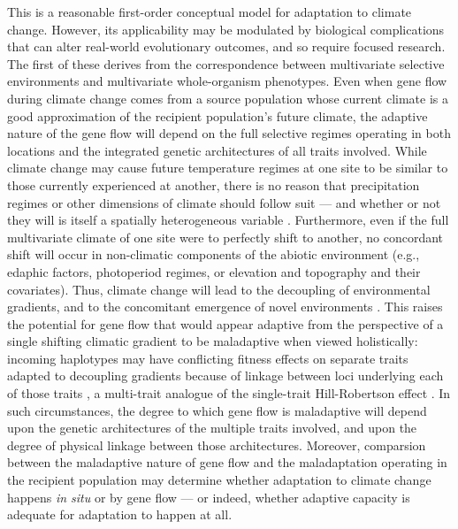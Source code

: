 \documentclass[9pt,twocolumn,twoside,lineno]{pnas-new}
\begin{document}
This is a reasonable first-order conceptual model
for adaptation to climate change.
However, its applicability may be modulated by biological complications
that can alter real-world evolutionary outcomes, and
so require focused research. 
The first of these derives from the correspondence between 
multivariate selective environments and multivariate whole-organism phenotypes. 
Even when gene 
flow during climate change comes from a source population whose current climate is a 
good approximation of the recipient population’s future climate, the adaptive nature 
of the gene flow will depend on the full selective regimes operating in both locations
and the integrated genetic architectures of all traits involved. 
While climate change may cause 
future temperature regimes at one site to be similar to those currently 
experienced at another, there is no reason that precipitation regimes or other
dimensions of climate should follow suit --- and whether or not they will is 
itself a spatially heterogeneous variable \cite{crimmins,daly}.
Furthermore, even if the full multivariate climate of one site were to 
perfectly shift to another, no concordant shift will occur in
non-climatic components of the abiotic environment (e.g., edaphic factors, photoperiod 
regimes, or elevation and topography and their covariates). 
Thus, climate change will 
lead to the decoupling of environmental gradients, 
and to the concomitant emergence of novel environments \cite{williams_novel_climates,williams_projected_novel_disappearing,fitzpatrick_climate_novelty_forecasts}. 
This raises the potential for gene flow that would appear adaptive
from the perspective of a single shifting climatic gradient
to be maladaptive when viewed holistically: 
incoming haplotypes may have conflicting fitness effects on separate traits
adapted to decoupling gradients
because of linkage between loci underlying each of those traits \cite{aitken_whitlock,schiffers},
a multi-trait analogue of the single-trait Hill-Robertson effect \cite{hill_robertson}. 
In such circumstances, the degree to which gene flow is maladaptive will depend
upon the genetic architectures of the multiple traits involved,
and upon the degree of physical linkage between those architectures.
Moreover, comparsion between the maladaptive nature of gene flow
and the maladaptation operating in the recipient population
may determine whether adaptation to climate change happens
\textit{in situ} or by gene flow --- or indeed,
whether adaptive capacity is adequate for adaptation to happen at all.
\end{document}
